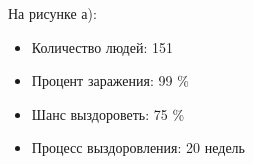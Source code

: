 \documentclass[14pt,a4paper,report]{report}
\begin{document}
\begin{figure}[h]
\begin{minipage}[h]{0.49\linewidth}
\end{minipage}
\hfill
\begin{minipage}[h]{0.49\linewidth}
\end{minipage}
\label{ris:image1}
\end{figure}


На рисунке а):
\begin{itemize}
\item Количество людей: 151
\item Процент заражения: 99 \%
\item Шанс выздороветь: 75 \%
\item Процесс выздоровления: 20 недель
\end{itemize}
\end{document}
